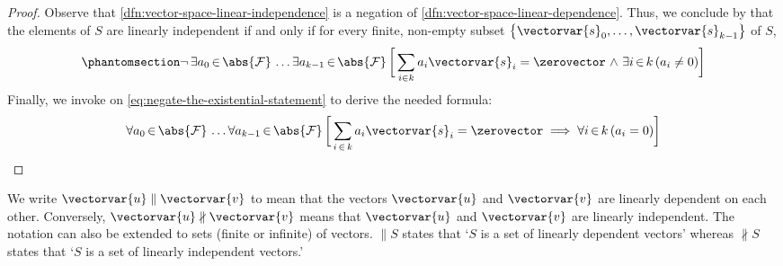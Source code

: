\begin{proof}
    Observe that \cref{dfn:vector-space-linear-independence} is a negation of \cref{dfn:vector-space-linear-dependence}. Thus,
    we conclude by  that
    the elements of \( S \) are linearly independent if and only if for every finite,
    non-empty subset \( \mleft\{ \vectorvar{s}_{0}, \dots, \vectorvar{s}_{k-1} \mright\} \) of \( S \),
    \begin{equation}
        \phantomsection \label{eq:negate-the-existential-statement}
        \lnot \, \exists a_{0}\,{\in}\,\abs{\mathcal{F}} \, \dots \exists a_{k-1}\,{\in}\,\abs{\mathcal{F}} \,
        \bigg[ \sum_{i \in k} a_{i}\vectorvar{s}_{i} = \zerovector \,\,{\land}\,\, \exists i\,{\in}\,k \, \mleft( a_{i} \neq 0 \mright) \bigg]
    \end{equation}
    Finally, we invoke  on \eqref{eq:negate-the-existential-statement}
    to derive the needed formula:
    \begin{equation*}
        \forall a_{0}\,{\in}\,\abs{\mathcal{F}} \, \dots \forall a_{k-1}\,{\in}\,\abs{\mathcal{F}} \,
        \bigg[ \sum_{i \,\in\, k} a_{i}\vectorvar{s}_{i} = \zerovector \implies \forall i\,{\in}\,k \, \mleft( a_{i} = 0 \mright) \bigg] \qedhere
    \end{equation*}
\end{proof}

\begin{notation}
     \label{notation:linear-dependence-and-independence}
    We write \( \vectorvar{u} \parallel \vectorvar{v} \) to mean that the vectors \( \vectorvar{u} \) and \( \vectorvar{v} \) are linearly
    dependent on each other. Conversely, \( \vectorvar{u} \nparallel \vectorvar{v} \) means that \( \vectorvar{u} \) and \( \vectorvar{v} \)
    are linearly independent. The notation can also be extended to sets (finite or infinite) of vectors.
    \( {\parallel} S \) states that `\( S \) is a set of linearly dependent vectors' whereas \( {\nparallel}S \) states that `\( S \) is a set of linearly
    independent vectors.'
\end{notation}

